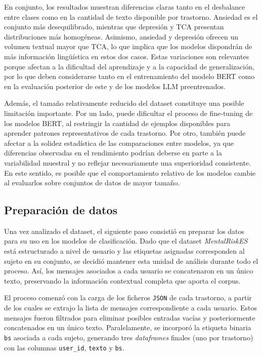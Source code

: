 En conjunto, los resultados muestran diferencias claras tanto en el desbalance entre clases como en la cantidad de texto disponible por trastorno. Ansiedad es el conjunto más desequilibrado, mientras que depresión y \ac{TCA} presentan distribuciones más homogéneas. Asimismo, ansiedad y depresión ofrecen un volumen textual mayor que \ac{TCA}, lo que implica que los modelos dispondrán de más información lingüística en estos dos casos. Estas variaciones son relevantes porque afectan a la dificultad del aprendizaje y a la capacidad de generalización, por lo que deben considerarse tanto en el entrenamiento del modelo \ac{BERT} como en la evaluación posterior de este y de los modelos LLM preentrenados.

Además, el tamaño relativamente reducido del dataset constituye una posible limitación importante. Por un lado, puede dificultar el proceso de fine-tuning de los modelos \ac{BERT}, al restringir la cantidad de ejemplos disponibles para aprender patrones representativos de cada trastorno. Por otro, también puede afectar a la solidez estadística de las comparaciones entre modelos, ya que diferencias observadas en el rendimiento podrían deberse en parte a la variabilidad muestral y no reflejar necesariamente una superioridad consistente. En este sentido, es posible que el comportamiento relativo de los modelos cambie al evaluarlos sobre conjuntos de datos de mayor tamaño.


\subsection{Preparación de datos}

Una vez analizado el dataset, el siguiente paso consistió en preparar los datos para su uso en los modelos de clasificación. Dado que el dataset \textit{MentalRiskES} está estructurado a nivel de usuario y las etiquetas asignadas corresponden al sujeto en su conjunto, se decidió mantener esta unidad de análisis durante todo el proceso. Así, los mensajes asociados a cada usuario se concatenaron en un único texto, preservando la información contextual completa que aporta el corpus.

El proceso comenzó con la carga de los ficheros \texttt{JSON} de cada trastorno, a partir de los cuales se extrajo la lista de mensajes correspondiente a cada usuario. Estos mensajes fueron filtrados para eliminar posibles entradas vacías y posteriormente concatenados en un único texto. Paralelamente, se incorporó la etiqueta binaria \texttt{bs} asociada a cada sujeto, generando tres \textit{dataframes} finales (uno por trastorno) con las columnas \texttt{user\_id}, \texttt{texto} y \texttt{bs}.

